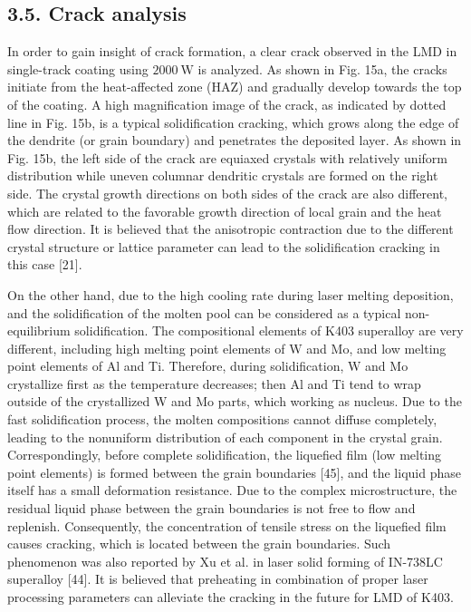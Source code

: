 \documentclass[10pt]{article}
\begin{document}
\subsection*{3.5. Crack analysis}
In order to gain insight of crack formation, a clear crack observed in the LMD in single-track coating using $2000 \mathrm{~W}$ is analyzed. As shown in Fig. 15a, the cracks initiate from the heat-affected zone (HAZ) and gradually develop towards the top of the coating. A high magnification image of the crack, as indicated by dotted line in Fig. 15b, is a typical solidification cracking, which grows along the edge of the dendrite (or grain boundary) and penetrates the deposited layer. As shown in Fig. 15b, the left side of the crack are equiaxed crystals with relatively uniform distribution while uneven columnar dendritic crystals are formed on the right side. The crystal growth directions on both sides of the crack are also different, which are related to the favorable growth direction of local grain and the heat flow direction. It is believed that the anisotropic contraction due to the different crystal structure or lattice parameter can lead to the solidification cracking in this case [21].

On the other hand, due to the high cooling rate during laser melting deposition, and the solidification of the molten pool can be considered as a typical non-equilibrium solidification. The compositional elements of K403 superalloy are very different, including high melting point elements of $\mathrm{W}$ and Mo, and low melting point elements of $\mathrm{Al}$ and Ti. Therefore, during solidification, $\mathrm{W}$ and Mo crystallize first as the temperature decreases; then $\mathrm{Al}$ and Ti tend to wrap outside of the crystallized W and Mo parts, which working as nucleus. Due to the fast solidification process, the molten compositions cannot diffuse completely, leading to the nonuniform distribution of each component in the crystal grain. Correspondingly, before complete solidification, the liquefied film (low melting point elements) is formed between the grain boundaries [45], and the liquid phase itself has a small deformation resistance. Due to the complex microstructure, the residual liquid phase between the grain boundaries is not free to flow and replenish. Consequently, the concentration of tensile stress on the liquefied film causes cracking, which is located between the grain boundaries. Such phenomenon was also reported by Xu et al. in laser solid forming of IN-738LC superalloy [44]. It is believed that preheating in combination of proper laser processing parameters can alleviate the cracking in the future for LMD of K403.
\end{document}
